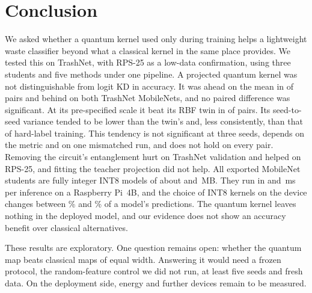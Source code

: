 \section{Conclusion}
\label{sec:conclusion}

We asked whether a quantum kernel used only during training helps a lightweight waste classifier beyond what a classical kernel in the same place provides.
We tested this on TrashNet, with RPS-25 as a low-data confirmation, using three students and five methods under one pipeline.
A projected quantum kernel was not distinguishable from logit KD in accuracy. It was ahead on the mean in \KdAheadFp{} of \NPairs{} pairs and behind on both TrashNet MobileNets, and no paired difference was significant.
At its pre-specified scale it beat its RBF twin in \GtwoFixedWins{} of \NPairs{} pairs.
Its seed-to-seed variance tended to be lower than the twin's and, less consistently, than that of hard-label training. This tendency is not significant at three seeds, depends on the metric and on one mismatched run, and does not hold on every pair.
Removing the circuit's entanglement hurt on TrashNet validation and helped on RPS-25, and fitting the teacher projection did not help.
All \NIntModels{} exported MobileNet students are fully integer INT8 models of about \MbMnvTwo{} and \MbMnvThree{}\,MB. They run in \LatMnvTwo{} and \LatMnvThree{}\,ms per inference on a Raspberry Pi~4B, and the choice of INT8 kernels on the device changes between \XnnDisMin{}\% and \XnnDisMax{}\% of a model's predictions.
The quantum kernel leaves nothing in the deployed model, and our evidence does not show an accuracy benefit over classical alternatives.

These results are exploratory.
One question remains open: whether the quantum map beats classical maps of equal width. Answering it would need a frozen protocol, the random-feature control we did not run, at least five seeds and fresh data. On the deployment side, energy and further devices remain to be measured.
